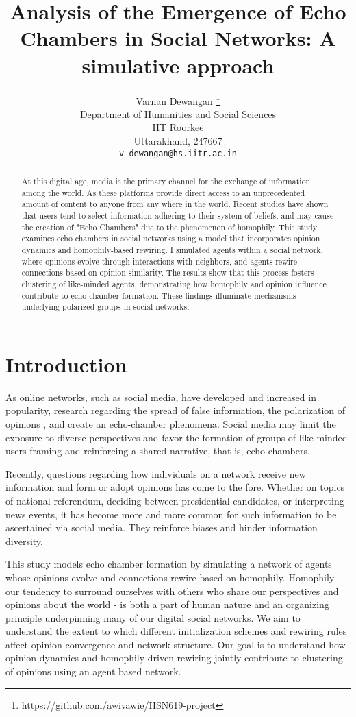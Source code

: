 \documentclass{article} %
\title{Analysis of the Emergence of Echo Chambers in Social Networks: A simulative approach}
\author{
Varnan Dewangan \thanks{ https://github.com/awivawie/HSN619-project} \\
Department of Humanities and Social Sciences\\
IIT Roorkee\\
Uttarakhand, 247667 \\
\texttt{v\_dewangan@hs.iitr.ac.in}
}
\begin{document}
\maketitle

\begin{abstract}
At this digital age, media is the primary channel for the exchange of information among the world. As these platforms provide direct access to an unprecedented amount of content to anyone from any where in the world. Recent studies have shown that users tend to select information adhering to their system of beliefs, and may cause the creation of "Echo Chambers" due to the phenomenon of homophily. This study examines echo chambers in social networks using a model that incorporates opinion dynamics and homophily-based rewiring. I simulated agents within a social network, where opinions evolve through interactions with neighbors, and agents rewire connections based on opinion similarity. The results show that this process fosters clustering of like-minded agents, demonstrating how homophily and opinion influence contribute to echo chamber formation. These findings illuminate mechanisms underlying polarized groups in social networks.
\end{abstract}



\section{Introduction}
\label{headings}
As online networks, such as social media, have developed
and increased in popularity, research regarding the spread of
false information, the polarization of opinions \cite{dandekar2013biased}, and create an echo-chamber phenomena. Social media may limit the exposure to diverse perspectives and favor the formation of groups of like-minded users framing and reinforcing a shared narrative, that is, echo chambers.\cite{cinelli2021echo}

Recently, questions regarding how individuals on a network receive new information and form or adopt opinions has come to the fore. Whether on topics of national referendum, deciding between presidential candidates, or interpreting news events, it has become more and more common for such information to be ascertained via social media. They reinforce biases and hinder information diversity. 

This study models echo chamber formation by simulating a network of agents whose opinions evolve and connections rewire based on homophily. Homophily - our tendency to surround ourselves with others who share our perspectives and opinions about the world - is both a part of human nature and an organizing principle underpinning many of our digital social networks.\cite{gillani2018me} We aim to understand the extent to which different initialization schemes and rewiring rules affect opinion convergence and network structure. Our goal is to understand how opinion dynamics and homophily-driven rewiring jointly contribute to clustering of opinions using an agent based network.
\end{document}
